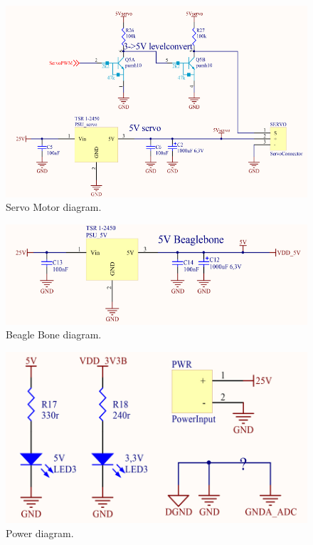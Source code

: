 \begin{figure}[H]
	\centering
	\includegraphics[scale=0.92]{figures/ServoMotor.pdf}
	\caption{Servo Motor diagram.}
	\label{labServoMotor}
\end{figure}\vspace{-5mm}


\begin{figure}[H]
	\centering
	\includegraphics[scale=0.92]{figures/BeagleBone.pdf}
	\caption{Beagle Bone diagram.}
	\label{labBeagleBone}
\end{figure}\vspace{-5mm}


\begin{figure}[H]
	\centering
	\includegraphics[scale=0.92]{figures/Power.pdf}
	\caption{Power diagram.}
	\label{labPower}
\end{figure}\vspace{-5mm}


